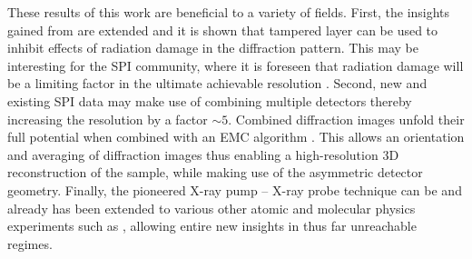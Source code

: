 %
%
These results of this work are beneficial to a variety of fields. First, the insights gained from \citep{Hoener-2008-JPB,Gorkhover-2016-NatPho} are extended and it is shown that tampered layer can be used to inhibit effects of radiation damage in the diffraction pattern. This may be interesting for the SPI community, where it is foreseen that radiation damage will be a limiting factor in the ultimate achievable resolution \citep{Aquila-2015-StrucDyn}. Second, new and existing SPI data may make use of combining multiple detectors thereby increasing the resolution by a factor $\sim 5$. Combined diffraction images unfold their full potential when combined with an EMC algorithm \citep{Loh-2009-PRE}. This allows an orientation and averaging of diffraction images thus enabling a high-resolution 3D reconstruction of the sample, while making use of the asymmetric detector geometry. Finally, the pioneered X-ray pump -- X-ray probe technique can be and already has been extended to various other atomic and molecular physics experiments such as \citep{Picon-2016-NatComm,Lehmann-2016-PRA,Kimberg-2016-FD,Al-Haddad-2017-unpublished,Ferguson-2016-SciAdv}, allowing entire new insights in thus far unreachable regimes.
%
%
%